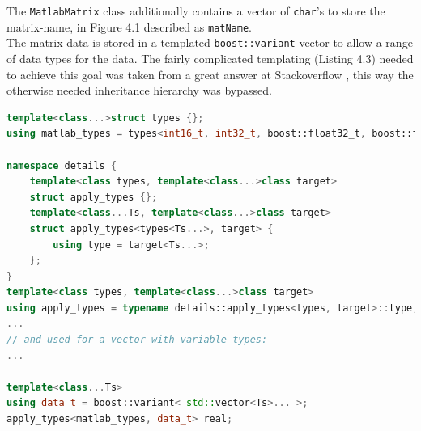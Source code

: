 The \texttt{MatlabMatrix} class additionally contains a vector of \texttt{char}'s to store the matrix-name, in Figure 4.1 described as \texttt{matName}.\\
The matrix data is stored in a templated \texttt{boost::variant} vector to allow a range of data types for the data. The fairly complicated templating (Listing 4.3) needed to achieve this goal was taken from a great answer at Stackoverflow \cite{stackof}, this way the otherwise needed inheritance hierarchy was bypassed. 
\vspace{1em}
\begin{lstlisting}[language=C++, caption=A code snippet showing the templating to allow various types in a Boost variant.]
template<class...>struct types {};
using matlab_types = types<int16_t, int32_t, boost::float32_t, boost::float64_t, uint8_t, uint16_t>;

namespace details {
    template<class types, template<class...>class target>
    struct apply_types {};
    template<class...Ts, template<class...>class target>
    struct apply_types<types<Ts...>, target> {
        using type = target<Ts...>;
    };
}
template<class types, template<class...>class target>
using apply_types = typename details::apply_types<types, target>::type;
...
// and used for a vector with variable types:
...

template<class...Ts>
using data_t = boost::variant< std::vector<Ts>... >;
apply_types<matlab_types, data_t> real;
\end{lstlisting}

